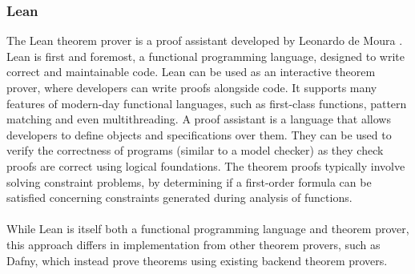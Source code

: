 \subsubsection{Lean}
The Lean theorem prover is a proof assistant developed by Leonardo de Moura \cite{lean}. Lean is first and foremost, a functional programming language, designed to write correct and maintainable code. Lean can be used as an interactive theorem prover, where developers can write proofs alongside code. It supports many features of modern-day functional languages, such as first-class functions, pattern matching and even multithreading. A proof assistant is a language that allows developers to define objects and specifications over them. They can be used to verify the correctness of programs (similar to a model checker) as they check proofs are correct using logical foundations. The theorem proofs typically involve solving constraint problems, by determining if a first-order formula can be satisfied concerning constraints generated during analysis of functions.
\\ \\
While Lean is itself both a functional programming language and theorem prover, this approach differs in implementation from other theorem provers, such as Dafny, which instead prove theorems using existing backend theorem provers.

